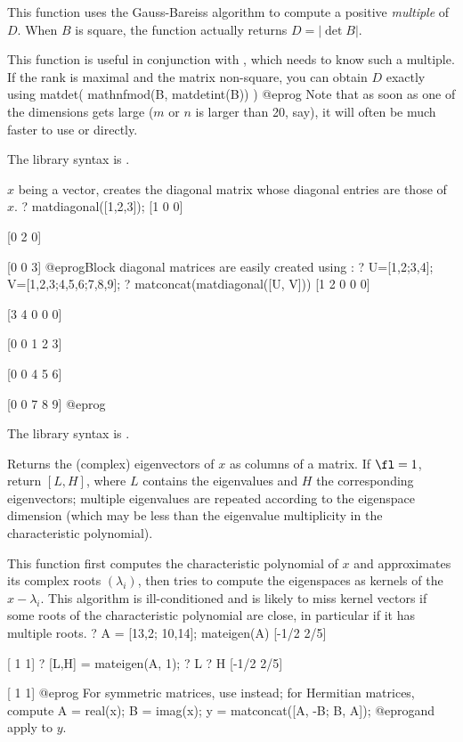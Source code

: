 This function uses the Gauss-Bareiss algorithm to compute a positive
\emph{multiple} of $D$. When $B$ is square, the function actually returns
$D = |\det B|$.

This function is useful in conjunction with , which needs to
know such a multiple. If the rank is maximal and the matrix non-square,
you can obtain $D$ exactly using
\bprog
  matdet( mathnfmod(B, matdetint(B)) )
@eprog\noindent
Note that as soon as one of the dimensions gets large ($m$ or $n$ is larger
than 20, say), it will often be much faster to use  or
 directly.

The library syntax is .

\label{se:matdiagonal}
$x$ being a vector, creates the diagonal matrix
whose diagonal entries are those of $x$.
\bprog
? matdiagonal([1,2,3]);
[1 0 0]

[0 2 0]

[0 0 3]
@eprog\noindent Block diagonal matrices are easily created using
:
\bprog
? U=[1,2;3,4]; V=[1,2,3;4,5,6;7,8,9];
? matconcat(matdiagonal([U, V]))
[1 2 0 0 0]

[3 4 0 0 0]

[0 0 1 2 3]

[0 0 4 5 6]

[0 0 7 8 9]
@eprog

The library syntax is .

\label{se:mateigen}
Returns the (complex) eigenvectors of $x$ as columns of a matrix.
If $\fl=1$, return $[L,H]$, where $L$ contains the
eigenvalues and $H$ the corresponding eigenvectors; multiple eigenvalues are
repeated according to the eigenspace dimension (which may be less
than the eigenvalue multiplicity in the characteristic polynomial).

This function first computes the characteristic polynomial of $x$ and
approximates its complex roots $(\lambda_i)$, then tries to compute the
eigenspaces as kernels of the $x - \lambda_i$. This algorithm is
ill-conditioned and is likely to miss kernel vectors if some roots of the
characteristic polynomial are close, in particular if it has multiple roots.
\bprog
? A = [13,2; 10,14]; mateigen(A)
[-1/2 2/5]

[   1   1]
? [L,H] = mateigen(A, 1);
? L
? H
[-1/2 2/5]

[   1   1]
@eprog\noindent
For symmetric matrices, use  instead; for Hermitian matrices,
compute
\bprog
 A = real(x);
 B = imag(x);
 y = matconcat([A, -B; B, A]);
@eprog\noindent and apply  to $y$.


